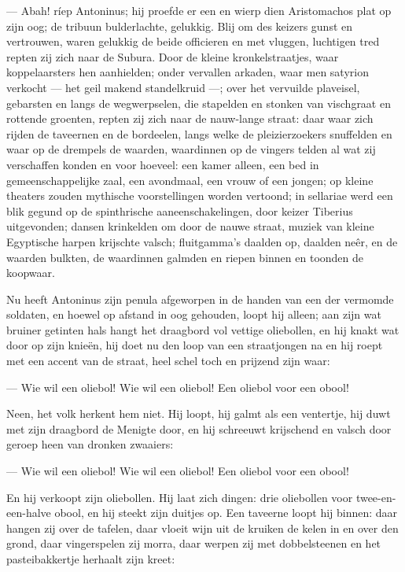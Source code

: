 \documentclass[a4paper, 12pt, oneside, dutch]{article}
\begin{document}
--- Abah! ríep Antoninus; hij proefde er een en wierp dien Aristomachos plat op zijn oog; de tribuun bulderlachte, gelukkig. Blij om des keizers gunst en vertrouwen, waren gelukkig de beide officieren en met vluggen, luchtigen tred repten zij zich naar de Subura. Door de kleine kronkelstraatjes, waar koppelaarsters hen aanhielden; onder vervallen arkaden, waar men satyrion verkocht --- het geil makend standelkruid ---; over het vervuilde plaveisel, gebarsten en langs de wegwerpselen, die stapelden en stonken van vischgraat en rottende groenten, repten zij zich naar de nauw-lange straat: daar waar zich rijden de taveernen en de bordeelen, langs welke de pleizierzoekers snuffelden en waar op de drempels de waarden, waardinnen op de vingers telden al wat zij verschaffen konden en voor hoeveel: een kamer alleen, een bed in gemeenschappelijke zaal, een avondmaal, een vrouw of een jongen; op kleine theaters zouden mythische voorstellingen worden vertoond; in sellariae werd een blik gegund op de spinthrische aaneenschakelingen, door keizer Tiberius uitgevonden; dansen krinkelden om door de nauwe straat, muziek van kleine Egyptische harpen krijschte valsch; fluitgamma's daalden op, daalden neêr, en de waarden bulkten, de waardinnen galmden en riepen binnen en toonden de koopwaar.

Nu heeft Antoninus zijn penula afgeworpen in de handen van een der vermomde soldaten, en hoewel op afstand in oog gehouden, loopt hij alleen; aan zijn wat bruiner getinten hals hangt het draagbord vol vettige oliebollen, en hij knakt wat door op zijn knieën, hij doet nu den loop van een straatjongen na en hij roept met een accent van de straat, heel schel toch en prijzend zijn waar:

--- Wie wil een oliebol! Wie wil een oliebol! Een oliebol voor een obool!

Neen, het volk herkent hem niet. Hij loopt, hij galmt als een ventertje, hij duwt met zijn draagbord de Menigte door, en hij schreeuwt krijschend en valsch door geroep heen van dronken zwaaiers:

--- Wie wil een oliebol! Wie wil een oliebol! Een oliebol voor een obool!

En hij verkoopt zijn oliebollen. Hij laat zich dingen: drie oliebollen voor twee-en-een-halve obool, en hij steekt zijn duitjes op. Een taveerne loopt hij binnen: daar hangen zij over de tafelen, daar vloeit wijn uit de kruiken de kelen in en over den grond, daar vingerspelen zij morra, daar werpen zij met dobbelsteenen en het pasteibakkertje herhaalt zijn kreet:
\end{document}
